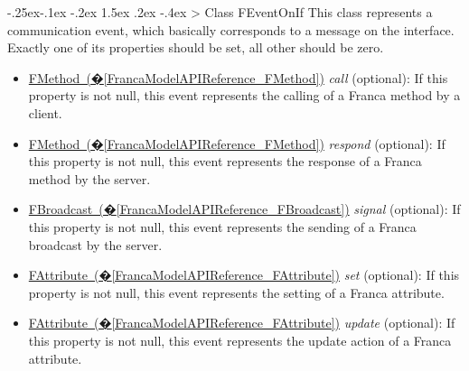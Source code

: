\documentclass[a4paper,10pt]{scrreprt}
\makeatletter
\renewcommand\subsection{\medskip\@startsection{subsection}{2}{\z@}%
  {-.25ex\@plus -.1ex \@minus -.2ex}%
  {1.5ex \@plus .2ex \@minus -.4ex}%
  {\ifnum \scr@compatibility>\@nameuse{scr@v@2.96}\relax
    \setlength{\parfillskip}{\z@ plus 1fil}\fi
    \raggedsection\normalfont\sectfont\nobreak\size@subsection
  }%
}
\newlength{\XdocItemIndent}
\makeatother
\begin{document}
\subsection{Class FEventOnIf}
\label{FrancaModelAPIReference_FEventOnIf}
This class represents a communication event,
which basically corresponds to a message on the interface.
Exactly one of its properties should be set, all other should be zero.
\setlength{\XdocItemIndent}{\textwidth}
\begin{itemize}
\addtolength{\XdocItemIndent}{-2.5em}
\item \begin{minipage}[t]{\XdocItemIndent}
\hyperref[FrancaModelAPIReference_FMethod]{FMethod~(�\ref*{FrancaModelAPIReference_FMethod})} \textit{call} (optional): If this property is not null, this event represents the calling of a Franca method by a client.

\end{minipage}
\item \begin{minipage}[t]{\XdocItemIndent}
\hyperref[FrancaModelAPIReference_FMethod]{FMethod~(�\ref*{FrancaModelAPIReference_FMethod})} \textit{respond} (optional): If this property is not null, this event represents the response of a Franca method by the server.

\end{minipage}
\item \begin{minipage}[t]{\XdocItemIndent}
\hyperref[FrancaModelAPIReference_FBroadcast]{FBroadcast~(�\ref*{FrancaModelAPIReference_FBroadcast})} \textit{signal} (optional): If this property is not null, this event represents the sending of a Franca broadcast by the server.

\end{minipage}
\item \begin{minipage}[t]{\XdocItemIndent}
\hyperref[FrancaModelAPIReference_FAttribute]{FAttribute~(�\ref*{FrancaModelAPIReference_FAttribute})} \textit{set} (optional): If this property is not null, this event represents the setting of a Franca attribute.

\end{minipage}
\item \begin{minipage}[t]{\XdocItemIndent}
\hyperref[FrancaModelAPIReference_FAttribute]{FAttribute~(�\ref*{FrancaModelAPIReference_FAttribute})} \textit{update} (optional): If this property is not null, this event represents the update action of a Franca attribute.

\end{minipage}
\end{itemize}
\addtolength{\XdocItemIndent}{2.5em}
\end{document}
